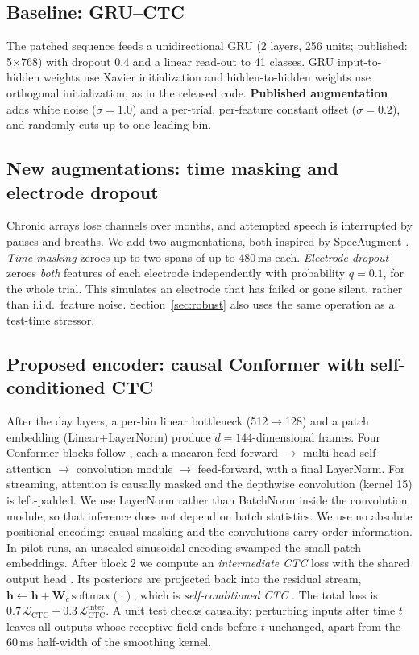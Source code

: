 \subsection{Baseline: GRU--CTC}
The patched sequence feeds a unidirectional GRU (2 layers, 256 units; published: 5$\times$768) with dropout 0.4 and a linear read-out to 41 classes. GRU input-to-hidden weights use Xavier initialization and hidden-to-hidden weights use orthogonal initialization, as in the released code.
\textbf{Published augmentation} adds white noise ($\sigma{=}1.0$) and a per-trial, per-feature constant offset ($\sigma{=}0.2$), and randomly cuts up to one leading bin.

\subsection{New augmentations: time masking and electrode dropout}
Chronic arrays lose channels over months, and attempted speech is interrupted by pauses and breaths. We add two augmentations, both inspired by SpecAugment \citep{park2019specaugment}.
\emph{Time masking} zeroes up to two spans of up to 480\,ms each.
\emph{Electrode dropout} zeroes \emph{both} features of each electrode independently with probability $q=0.1$, for the whole trial. This simulates an electrode that has failed or gone silent, rather than i.i.d.\ feature noise.
Section~\ref{sec:robust} also uses the same operation as a test-time stressor.

\subsection{Proposed encoder: causal Conformer with self-conditioned CTC}
After the day layers, a per-bin linear bottleneck (512$\to$128) and a patch embedding (Linear+LayerNorm) produce $d{=}144$-dimensional frames. Four Conformer blocks follow \citep{gulati2020conformer}, each a macaron feed-forward $\to$ multi-head self-attention $\to$ convolution module $\to$ feed-forward, with a final LayerNorm. For streaming, attention is causally masked and the depthwise convolution (kernel 15) is left-padded. We use LayerNorm rather than BatchNorm inside the convolution module, so that inference does not depend on batch statistics.
We use no absolute positional encoding: causal masking and the convolutions carry order information. In pilot runs, an unscaled sinusoidal encoding swamped the small patch embeddings.
After block 2 we compute an \emph{intermediate CTC} loss with the shared output head \citep{lee2021intermediate}. Its posteriors are projected back into the residual stream, $\mathbf{h}\leftarrow\mathbf{h}+\mathbf{W}_c\,\mathrm{softmax}(\cdot)$, which is \emph{self-conditioned CTC} \citep{nozaki2021selfcond}. The total loss is $0.7\,\mathcal{L}_{\text{CTC}}+0.3\,\mathcal{L}_{\text{CTC}}^{\text{inter}}$.
A unit test checks causality: perturbing inputs after time $t$ leaves all outputs whose receptive field ends before $t$ unchanged, apart from the 60\,ms half-width of the smoothing kernel.

